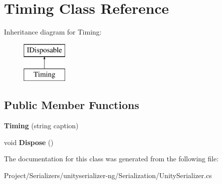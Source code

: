\hypertarget{class_timing}{}\section{Timing Class Reference}
\label{class_timing}
Inheritance diagram for Timing\+:\begin{figure}[H]
\begin{center}
\leavevmode
\includegraphics[height=2.000000cm]{class_timing}
\end{center}
\end{figure}
\subsection*{Public Member Functions}
\begin{DoxyCompactItemize}
\item 
\mbox{\label{class_timing_ab4f3d9f7f0d4b8e8813a7dda642a63a4}} 
{\bfseries Timing} (string caption)
\item 
\mbox{\label{class_timing_a955a1d9e65579124a6ba9da8a47bc2f8}} 
void {\bfseries Dispose} ()
\end{DoxyCompactItemize}


The documentation for this class was generated from the following file\+:\begin{DoxyCompactItemize}
\item 
Project/\+Serializers/unityserializer-\/ng/\+Serialization/Unity\+Serializer.\+cs\end{DoxyCompactItemize}

